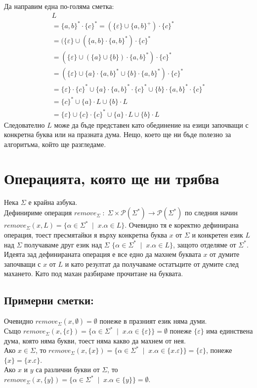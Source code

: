 \documentclass[12pt]{article}
\begin{document}
Да направим една по-голяма сметка:
\begin{align*}
L \\
= \{a, b\}^* \cdot \{c\}^*
= (\{\varepsilon\} \cup \{a, b\}^+) \cdot \{c\}^* \\
= (\{\varepsilon\} \cup (\{a, b\} \cdot \{a, b\}^* ) \cdot \{c\}^*  \\
= (\{\varepsilon\} \cup (\{a\} \cup \{b\}) \cdot \{a, b\}^* ) \cdot \{c\}^* \\
= (\{\varepsilon\} \cup \{a\} \cdot \{a, b\}^* \cup \{b\} \cdot \{a, b\}^* ) \cdot \{c\}^* \\
= \{\varepsilon\} \cdot \{c\}^* \cup \{a\} \cdot \{a, b\}^* \cdot \{c\}^* \cup \{b\} \cdot \{a, b\}^* \cdot \{c\}^* \\
= \{c\}^* \cup \{a\} \cdot L \cup \{b\} \cdot L \\
= \{\varepsilon\} \cup \{c\} \cdot \{c\}^* \cup \{a\} \cdot L \cup \{b\} \cdot L
\end{align*}
Следователно \(L\) може да бъде представен като обединение на езици започващи с конкретна буква
или на празната дума. Нещо, което ще ни бъде полезно за алгоритъма, който ще разгледаме.

\section{Операцията, която ще ни трябва}
Нека \(\Sigma\) е крайна азбука. \\
Дефинириме операция
\(remove_\Sigma \; : \; \Sigma \times \mathcal{P}(\Sigma^*)  \to \mathcal{P}(\Sigma^*)\) по следния начин\\
\(remove_\Sigma(x, L) = \{\alpha \in \Sigma^* \; \mid \; x.\alpha \in L\}\).
Очевидно тя е коректно дефинирана операция, тоест пресмятайки я върху конкретна буква \(x\) от \(\Sigma\) и конкретен език \(L\) над \(\Sigma\) получаваме 
друг език над \(\Sigma\) \(\{\alpha \in \Sigma^* \; \mid \; x.\alpha \in L\}\),
защото отделяме от \(\Sigma^*\).
Идеята зад дефинираната операция е все едно да махнем буквата \(x\) от думите започващи с \(x\) от \(L\)
и като резултат да получаваме остатъците от думите след махането.
Като под махан разбираме прочитане на буквата.

\subsection{Примерни сметки:}
Очевидно \(remove_\Sigma(x, \emptyset) = \emptyset\) понеже в празният език няма думи. \\
Също \(remove_\Sigma(x, \{\varepsilon\}) = \{\alpha \in \Sigma^* \; \mid \; x.\alpha \in \{\varepsilon\}\} = \emptyset\)
понеже \(\{\varepsilon\}\) има единствена дума, която няма букви, тоест няма какво да махнем от нея.\\
Ако \(x \in \Sigma\), то \(remove_\Sigma(x, \{x\}) = \{\alpha \in \Sigma^* \; \mid \; x.\alpha \in \{x.\varepsilon\}\} = \{\varepsilon\}\),
понеже \(\{x\} = \{x.\varepsilon\}\). \\
Ако \(x\) и \(y\) са различни букви от \(\Sigma\), то \\
\(remove_\Sigma(x, \{y\}) = \{\alpha \in \Sigma^* \; \mid \; x.\alpha \in \{y\}\} = \emptyset\). \\
\end{document}
